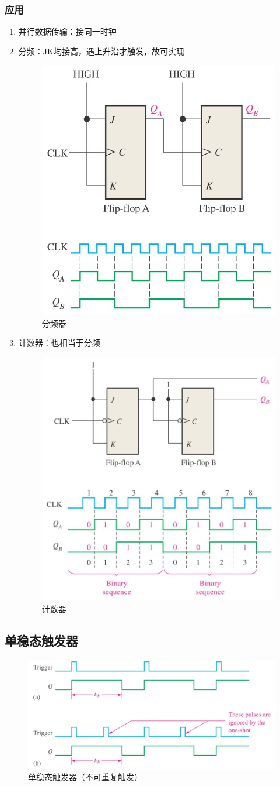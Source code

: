 \subsubsection{应用}
\begin{enumerate}
	\item 并行数据传输：接同一时钟
	\item 分频：JK均接高，遇上升沿才触发，故可实现
\begin{figure}[htbp]
	\centering
	\includegraphics[width=0.4\linewidth]{fig/frequency_divisor.jpg}
	\caption{分频器}
\end{figure}
	\item 计数器：也相当于分频
\begin{figure}[htbp]
	\centering
	\includegraphics[width=0.4\linewidth]{fig/counter.jpg}
	\caption{计数器}
\end{figure}
\end{enumerate}

\subsection{单稳态触发器}
\begin{figure}[htbp]
	\centering
	\includegraphics[width=0.6\linewidth]{fig/one-shot.jpg}
	\caption{单稳态触发器（不可重复触发）}
\end{figure}

